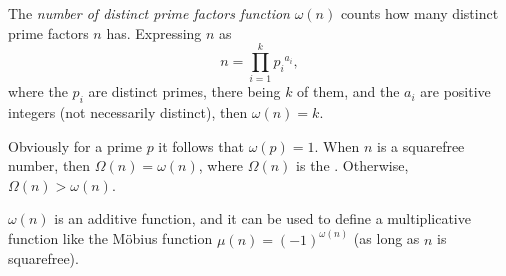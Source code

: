 \documentclass[12pt]{article}
\begin{document}
The {\em number of distinct prime factors function} $\omega(n)$ counts how many distinct prime factors $n$ has. Expressing $n$ as $$n = \prod_{i = 1}^k {p_i}^{a_i},$$ where the $p_i$ are distinct primes, there being $k$ of them, and  the $a_i$ are positive integers (not necessarily distinct), then $\omega(n) = k$.

Obviously for a prime $p$ it follows that $\omega(p) = 1$. When $n$ is a squarefree number, then $\Omega(n) = \omega(n)$, where $\Omega(n)$ is the . Otherwise, $\Omega(n) > \omega(n)$.

$\omega(n)$ is an additive function, and it can be used to define a multiplicative function like the M\"obius function $\mu(n) = (-1)^{\omega(n)}$ (as long as $n$ is squarefree).
\end{document}
